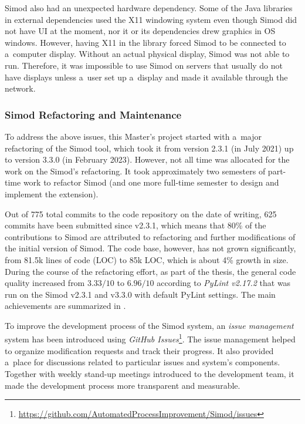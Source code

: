 \documentclass[12pt]{article}
\begin{document}
Simod also had an unexpected hardware dependency. Some of the Java libraries in external dependencies used the X11 windowing system even though Simod did not have UI at the moment, nor it or its dependencies drew graphics in OS windows. However, having X11 in the library forced Simod to be connected to a~computer display. Without an actual physical display, Simod was not able to run. Therefore, it was impossible to use Simod on servers that usually do not have displays unless a~user set up a~display and made it available through the network.

\subsubsection{Simod Refactoring and Maintenance}

To address the above issues, this Master's project started with a~major refactoring of the Simod tool, which took it from version 2.3.1 (in July 2021) up to version 3.3.0 (in February 2023).
However, not all time was allocated for the work on the Simod's refactoring. It took approximately two semesters of part-time work to refactor Simod (and one more full-time semester to design and implement the extension).

Out of 775 total commits to the code repository on the date of writing, 625 commits have been submitted since v2.3.1, which means that 80\% of the contributions to Simod are attributed to refactoring and further modifications of the initial version of Simod. 
The code base, however, has not grown significantly, from 81.5k lines of code (LOC) to 85k LOC, which is about 4\% growth in size. 
During the course of the refactoring effort, as part of the thesis, the general code quality increased from $3.33/10$ to $6.96/10$ according to \emph{PyLint v2.17.2} that was run on the Simod v2.3.1 and v3.3.0 with default PyLint settings.
The main achievements are summarized in .

To improve the development process of the Simod system, an \emph{issue management} system has been introduced using \emph{GitHub Issues}\footnote{\href{https://github.com/AutomatedProcessImprovement/Simod/issues}{https://github.com/AutomatedProcessImprovement/Simod/issues}}.
The issue management helped to organize modification requests and track their progress. 
It also provided a~place for discussions related to particular issues and system's components. 
Together with weekly stand-up meetings introduced to the development team, it made the development process more transparent and measurable.
\end{document}
